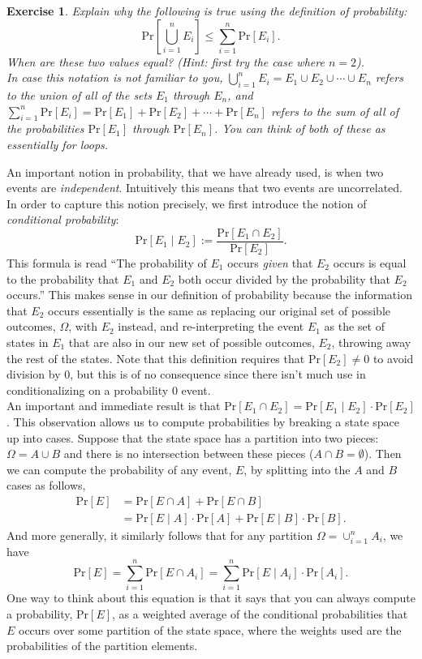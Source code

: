 \documentclass[12pt]{article}
\newcommand{\pr}[1]{\text{Pr}\left[#1\right]}
\newtheorem{exercise}{Exercise}
\theoremstyle{definition}
\theoremstyle{remark}
\theoremstyle{definition}
\begin{document}
\begin{exercise}
Explain why the following is true using the definition of probability: $$\pr{\bigcup_{i=1}^n E_i}\leq \sum_{i=1}^n\pr{E_i}.$$ When are these two values equal? (Hint: first try the case where $n=2$).\\

In case this notation is not familiar to you, $\bigcup_{i=1}^n E_i = E_1\cup E_2\cup\cdots\cup E_n$ refers to the union of all of the sets $E_1$ through $E_n$, and $\sum_{i=1}^n\pr{E_i} = \pr{E_1} + \pr{E_2} + \cdots + \pr{E_n}$ refers to the sum of all of the probabilities $\pr{E_1}$ through $\pr{E_n}$. You can think of both of these as essentially for loops.
\end{exercise}

An important notion in probability, that we have already used, is when two events are \emph{independent}. Intuitively this means that two events are uncorrelated. In order to capture this notion precisely, we first introduce the notion of \emph{conditional probability}: $$\pr{E_1\mid E_2} := \frac{\pr{E_1\cap E_2}}{\pr{E_2}}.$$ This formula is read ``The probability of $E_1$ occurs \emph{given} that $E_2$ occurs is equal to the probability that $E_1$ and $E_2$ both occur divided by the probability that $E_2$ occurs.'' This makes sense in our definition of probability because the information that $E_2$ occurs essentially is the same as replacing our original set of possible outcomes, $\Omega$, with $E_2$ instead, and re-interpreting the event $E_1$ as the set of states in $E_1$ that are also in our new set of possible outcomes, $E_2$, throwing away the rest of the states. Note that this definition requires that $\pr{E_2}\neq 0$ to avoid division by $0$, but this is of no consequence since there isn't much use in conditionalizing on a probability $0$ event.\\

An important and immediate result is that $\pr{E_1\cap E_2} = \pr{E_1\mid E_2}\cdot \pr{E_2}$. This observation allows us to compute probabilities by breaking a state space up into cases. Suppose that the state space has a partition into two pieces: $\Omega = A\cup B$ and there is no intersection between these pieces ($A\cap B = \emptyset$). Then we can compute the probability of any event, $E$, by splitting into the $A$ and $B$ cases as follows,
\begin{align*}
\pr{E} &=  \pr{E\cap A} + \pr{E\cap B}\\
&= \pr{E\mid A}\cdot \pr{A} + \pr{E\mid B}\cdot\pr{B}.
\end{align*}
And more generally, it similarly follows that for any partition $\Omega = \cup_{i=1}^nA_i$, we have $$\pr{E} = \sum_{i=1}^n\pr{E\cap A_i} = \sum_{i=1}^n\pr{E\mid A_i}\cdot \pr{A_i}.$$
One way to think about this equation is that it says that you can always compute a probability, $\pr{E}$, as a weighted average of the conditional probabilities that $E$ occurs over some partition of the state space, where the weights used are the probabilities of the partition elements.\\
\end{document}

